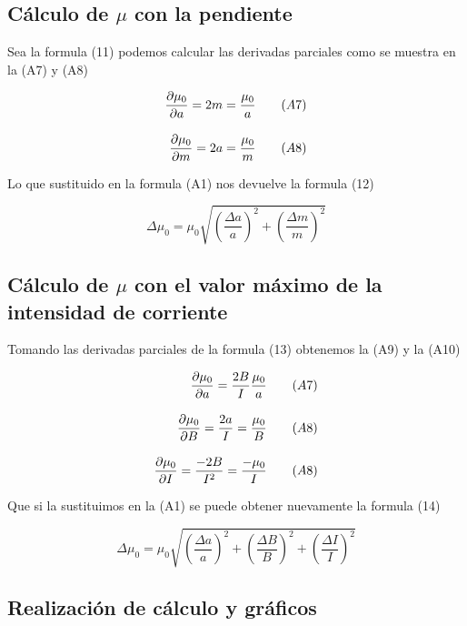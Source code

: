 \documentclass[article, 11pt]{report}
\newcommand{\dpartial}[2]{\frac{\partial #1 }{\partial #2}}
\begin{document}
\subsection*{Cálculo de $\mu$ con la pendiente}

Sea la formula (11) podemos calcular las derivadas parciales como se muestra en la (A7) y (A8)


\begin{equation*}
	\setlength{\jot}{12pt} %
	\begin{split}
		\dpartial{\mu_0}{a} = 2m =\dfrac{\mu_0}{a}  ~~~~~~ (A7) \\
		\dpartial{\mu_0}{m} = 2a =\dfrac{\mu_0}{m} ~~~~~~ (A8) \\
	\end{split}
\end{equation*}


Lo que sustituido en la formula (A1) nos devuelve la formula (12)

$$ \Delta \mu_0 = \mu_0 \sqrt{(\dfrac{\Delta a}{a})^2 + (\dfrac{\Delta m}{m})^2} $$



\subsection*{Cálculo de $\mu$ con el valor máximo de la intensidad de corriente}

Tomando las derivadas parciales de la formula (13) obtenemos la (A9) y la (A10)

\begin{equation*}
	\setlength{\jot}{12pt} %
	\begin{split}
		\dpartial{\mu_0}{a} = \dfrac{2B}{I} \dfrac{\mu_0}{a}  ~~~~~~ (A7) \\
		\dpartial{\mu_0}{B} = \dfrac{2a}{I} =\dfrac{\mu_0}{B} ~~~~~~ (A8) \\
		\dpartial{\mu_0}{I} = \dfrac{-2B}{I^2} =\dfrac{-\mu_0}{I} ~~~~~~ (A8) \\
	\end{split}
\end{equation*}


Que si la sustituimos en la (A1) se puede obtener nuevamente la formula (14)


$$ \Delta \mu_0 = \mu_0 \sqrt{(\dfrac{\Delta a}{a})^2   +  (\dfrac{\Delta B}{B})^2 + (\dfrac{\Delta I}{I})^2 }$$


\subsection*{Realización de cálculo y gráficos}
\end{document}
